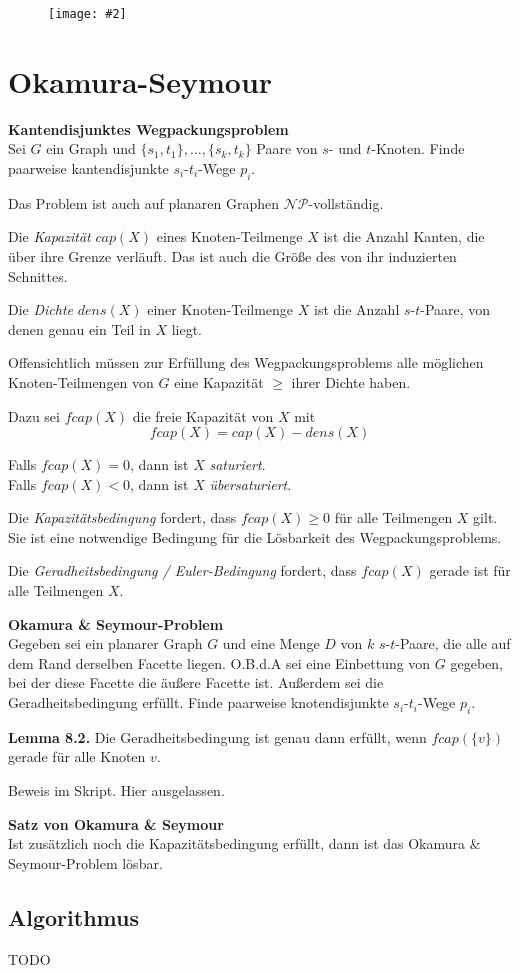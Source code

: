 \documentclass[10pt,a4paper]{article}
\makeatletter
\def\maxwidth#1{\ifdim\Gin@nat@width>#1 #1\else\Gin@nat@width\fi}
\newcommand{\imageFigure}[4]{%
    \begin{figure}[h]%
        \centering%
        {%
            \setlength{\fboxsep}{1pt}%
            \setlength{\fboxrule}{1pt}%
            \texttt{[image: \#2]}%
        }%
        \caption{#1}%
        \label{fig:#4}%
    \end{figure}%
}
\makeatother
\begin{document}
\imageFigure{}{menger4.png}{1}{menger4}


\clearpage
\section{Okamura-Seymour}
\textbf{Kantendisjunktes Wegpackungsproblem}\\
Sei $G$ ein Graph und $\{s_1, t_1\}, \dots, \{s_k, t_k\}$ Paare von $s$- und
$t$-Knoten.
Finde paarweise kantendisjunkte $s_i$-$t_i$-Wege $p_i$.

Das Problem ist auch auf planaren Graphen $\mathcal{NP}$-vollständig.

Die \textit{Kapazität} $cap(X)$ eines Knoten-Teilmenge $X$ ist die Anzahl Kanten, die
über ihre Grenze verläuft.
Das ist auch die Größe des von ihr induzierten Schnittes.

Die \textit{Dichte} $dens(X)$ einer Knoten-Teilmenge $X$ ist die Anzahl
$s$-$t$-Paare, von denen genau ein Teil in $X$ liegt.

Offensichtlich müssen zur Erfüllung des Wegpackungsproblems alle möglichen
Knoten-Teilmengen von $G$ eine Kapazität $\geq$ ihrer Dichte haben.

Dazu sei $fcap(X)$ die freie Kapazität von $X$ mit
$$ fcap(X) = cap(X) - dens(X) $$

Falls $fcap(X) = 0$, dann ist $X$ \textit{saturiert}.\\
Falls $fcap(X) < 0$, dann ist $X$ \textit{übersaturiert}.

Die \textit{Kapazitätsbedingung} fordert, dass $fcap(X) \geq 0$ für
alle Teilmengen $X$ gilt.
Sie ist eine notwendige Bedingung für die Lösbarkeit des Wegpackungsproblems.

Die \textit{Geradheitsbedingung / Euler-Bedingung} fordert, dass $fcap(X)$
gerade ist für alle Teilmengen $X$.

\textbf{Okamura \& Seymour-Problem}\\
Gegeben sei ein planarer Graph $G$ und eine Menge $D$ von $k$ $s$-$t$-Paare,
die alle auf dem Rand derselben Facette liegen.
O.B.d.A sei eine Einbettung von $G$ gegeben, bei der diese Facette die äußere
Facette ist.
Außerdem sei die Geradheitsbedingung erfüllt.
Finde paarweise knotendisjunkte $s_i$-$t_i$-Wege $p_i$.

\textbf{Lemma 8.2.}
Die Geradheitsbedingung ist genau dann erfüllt, wenn $fcap(\{v\})$ gerade für
alle Knoten $v$.

Beweis im Skript. Hier ausgelassen.

\textbf{Satz von Okamura \& Seymour}\\
Ist zusätzlich noch die Kapazitätsbedingung erfüllt, dann ist das Okamura \&
Seymour-Problem lösbar.

\subsection{Algorithmus}

TODO %
\end{document}
